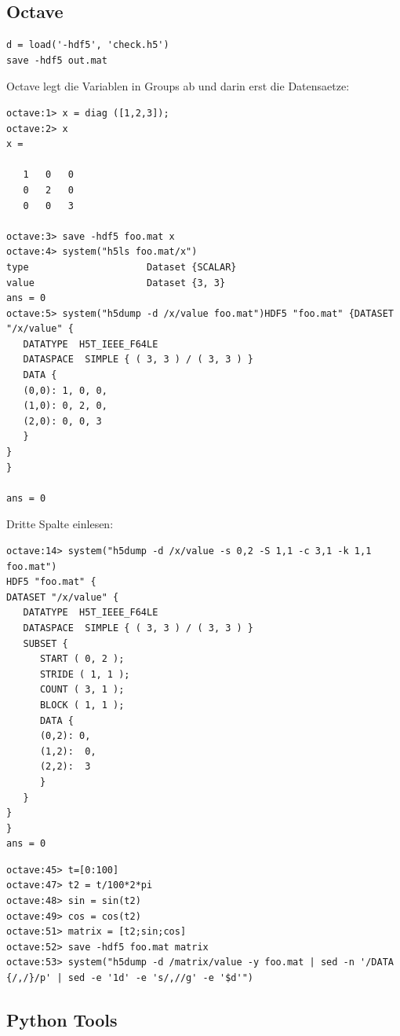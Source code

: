 \subsection{Octave}

\begin{verbatim}
d = load('-hdf5', 'check.h5')
save -hdf5 out.mat
\end{verbatim}

Octave legt die Variablen in Groups ab und darin erst die Datensaetze:

\begin{verbatim}
octave:1> x = diag ([1,2,3]);
octave:2> x
x =

   1   0   0
   0   2   0
   0   0   3

octave:3> save -hdf5 foo.mat x
octave:4> system("h5ls foo.mat/x")
type                     Dataset {SCALAR}
value                    Dataset {3, 3}
ans = 0
octave:5> system("h5dump -d /x/value foo.mat")HDF5 "foo.mat" {DATASET "/x/value" {
   DATATYPE  H5T_IEEE_F64LE
   DATASPACE  SIMPLE { ( 3, 3 ) / ( 3, 3 ) }
   DATA {
   (0,0): 1, 0, 0,
   (1,0): 0, 2, 0,
   (2,0): 0, 0, 3
   }
}
}

ans = 0
\end{verbatim}

Dritte Spalte einlesen:

\begin{verbatim}
octave:14> system("h5dump -d /x/value -s 0,2 -S 1,1 -c 3,1 -k 1,1 foo.mat")
HDF5 "foo.mat" {
DATASET "/x/value" {
   DATATYPE  H5T_IEEE_F64LE
   DATASPACE  SIMPLE { ( 3, 3 ) / ( 3, 3 ) }
   SUBSET {
      START ( 0, 2 );
      STRIDE ( 1, 1 );
      COUNT ( 3, 1 );
      BLOCK ( 1, 1 );
      DATA {
      (0,2): 0,
      (1,2):  0,
      (2,2):  3
      }
   }
}
}
ans = 0
\end{verbatim}

\begin{verbatim}
octave:45> t=[0:100]
octave:47> t2 = t/100*2*pi
octave:48> sin = sin(t2)
octave:49> cos = cos(t2)
octave:51> matrix = [t2;sin;cos]
octave:52> save -hdf5 foo.mat matrix
octave:53> system("h5dump -d /matrix/value -y foo.mat | sed -n '/DATA {/,/}/p' | sed -e '1d' -e 's/,//g' -e '$d'")
\end{verbatim}


\subsection{Python Tools}

\cite{Langtangen2011, Langtangen2008, Alchin2010, Pilgrim2009, Pilgrim2004}

